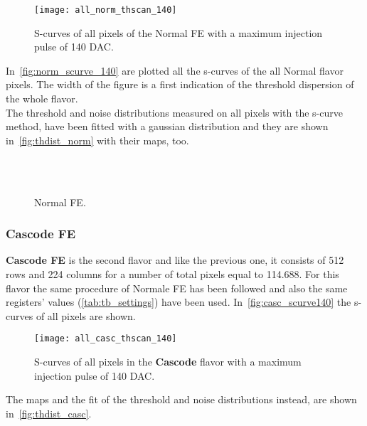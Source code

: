 \begin{figure}[h!]
\centering
\texttt{[image: all\_norm\_thscan\_140]}
\caption{S-curves of all pixels of the Normal FE with a maximum injection pulse of 140 DAC.}
\label{fig:norm_scurve_140}
\end{figure}


In~\autoref{fig:norm_scurve_140} are plotted all the s-curves of the all Normal flavor pixels. The width of the figure is a first indication of the threshold dispersion of the whole flavor.\\

The threshold and noise distributions measured on all pixels with the s-curve method, have been fitted with a gaussian distribution and they are shown in~\autoref{fig:thdist_norm} with their maps, too.

\begin{figure}[h!]
\centering
{}\quad
{}\\
\quad
{}\\
\caption{Normal FE.}
\label{fig:thdist_norm}
\end{figure}



\subsubsection{Cascode FE}

\textbf{Cascode FE} is the second flavor and like the previous one, it consists of 512 rows and 224 columns for a number of total pixels equal to 114.688. For this flavor the same procedure of Normale FE has been followed and also the same registers' values (\autoref{tab:tb_settings}) have been used.
In~\autoref{fig:casc_scurve140} the s-curves of all pixels are shown.

\begin{figure}[h!]
\centering
\texttt{[image: all\_casc\_thscan\_140]}
\caption{S-curves of all pixels in the \textbf{Cascode} flavor with a maximum injection pulse of 140 DAC.}
\label{fig:casc_scurve140}
\end{figure}

The maps and the fit of the threshold and noise distributions instead, are shown in~\autoref{fig:thdist_casc}.


